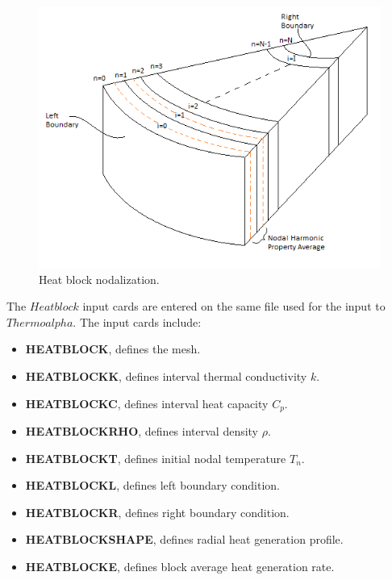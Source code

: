 \documentclass[11pt,letterpaper,titlepage]{article}
\begin{document}
	\begin{center}
		\begin{minipage}[c]{0.85\textwidth}
	
			\begin{figure}[H]
			
				\includegraphics[width=6in]{ZZZ_HeatBlock.png}
				\caption{Heat block nodalization.}
				\label{figure:ZZZ_HeatBlock}
			\end{figure}
		\end{minipage}
	\end{center}
\vspace{0.5cm}
\newpage
\noindent
The $Heatblock$ input cards are entered on the same file used for the input to $Thermoalpha$. The input cards include:
\begin{itemize}
\item \textbf{HEATBLOCK}, defines the mesh.
\item \textbf{HEATBLOCKK}, defines interval thermal conductivity $k$.
\item \textbf{HEATBLOCKC}, defines interval heat capacity $C_p$.
\item \textbf{HEATBLOCKRHO}, defines interval density $\rho$.
\item \textbf{HEATBLOCKT}, defines initial nodal temperature $T_n$.
\item \textbf{HEATBLOCKL}, defines left boundary condition.
\item \textbf{HEATBLOCKR}, defines right boundary condition.
\item \textbf{HEATBLOCKSHAPE}, defines radial heat generation profile.
\item \textbf{HEATBLOCKE}, defines block average heat generation rate.
\end{itemize}
\end{document}
